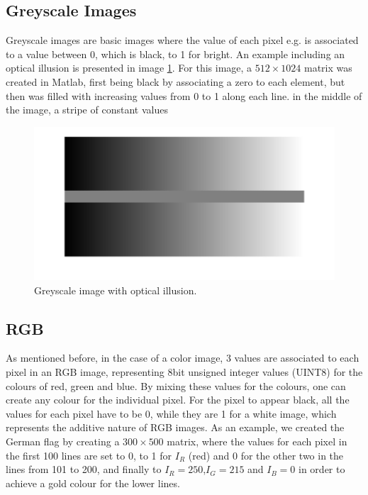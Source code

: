\subsection{Greyscale Images}
Greyscale images are basic images where the value of each pixel e.g. is associated to a value between 0, which is black, to 1 for bright. An example including an optical illusion is presented in image \ref{fig:greyillusion}. For this image, a $512\times 1024$ matrix was created in Matlab, first being black by associating a zero to each element, but then was filled with increasing values from 0 to 1 along each line. in the middle of the image, a stripe of  constant values %

\begin{figure}[H]
	\centering
		\includegraphics[width=\textwidth]{images/greyillusion.png}
		\caption{Greyscale image with optical illusion.}
		\label{fig:greyillusion}
\end{figure}

\subsection{RGB}
As mentioned before, in the case of a color image, 3 values are associated to each pixel in an RGB image, representing 8bit unsigned integer values (UINT8) for the colours of red, green and blue. By mixing these values for the colours, one can create any colour for the individual pixel. For the pixel to appear black, all the values for each pixel have to be 0, while they are 1 for a white image, which represents the additive nature of RGB images. As an example, we created the German flag by creating a $300\times500$ matrix, where the values for each pixel in the first 100 lines are set to 0, to 1 for $I_{R}$ (red) and  0 for the other two in the lines from 101 to 200, and finally to $I_{R}=250$,$ I_{G}=215$ and $I_{B}=0$ in order to achieve a gold colour for the lower lines. 


